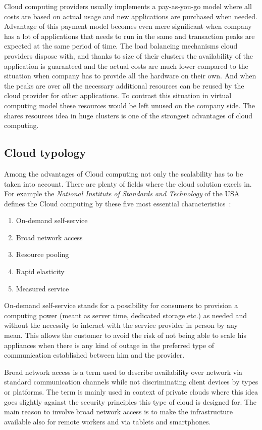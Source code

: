 Cloud computing providers usually implements a pay-as-you-go model where all costs are based on actual usage and new applications are purchased when needed. Advantage of this payment model becomes even mere significant when company has a lot of applications that needs to run in the same and transaction peaks are expected at the same period of time. The load balancing mechanisms cloud providers dispose with, and thanks to size of their clusters the availability of the application is guaranteed  and the actual costs are much lower compared to the situation when company has to provide all the hardware on their own. And when the peaks are over all the necessary additional resources can be reused by the cloud provider for other applications. To contrast this situation in virtual computing model these resources would be left unused on the company side. The shares resources idea in huge clusters is one of the strongest advantages of cloud computing.

\subsection{Cloud typology}
\label{sub:Cloud typology}

Among the advantages of Cloud computing not only the scalability has to be taken into account. There are plenty of fields where the cloud solution excels in. For example the \emph{National Institute of Standards and Technology} of the USA defines the Cloud computing by these five most essential characteristics~\cite{hu}:

\begin{enumerate}
	\item On-demand self-service
	\item Broad network access
	\item Resource pooling
	\item Rapid elasticity
	\item Measured service
\end{enumerate}

On-demand self-service stands for a possibility for consumers to provision a computing power (meant as server time, dedicated storage etc.) as needed and without the necessity to interact with the service provider in person by any mean. This allows the customer to avoid the risk of not being able to scale his appliances when there is any kind of outage in the preferred type of communication established between him and the provider.

Broad network access is a term used to describe availability over network via standard communication channels while not discriminating client devices by types or platforms. The term is mainly used in context of private clouds where this idea goes slightly against the security principles this type of cloud is designed for. The main reason to involve broad network access is to make the infrastructure available also for remote workers and via tablets and smartphones.

